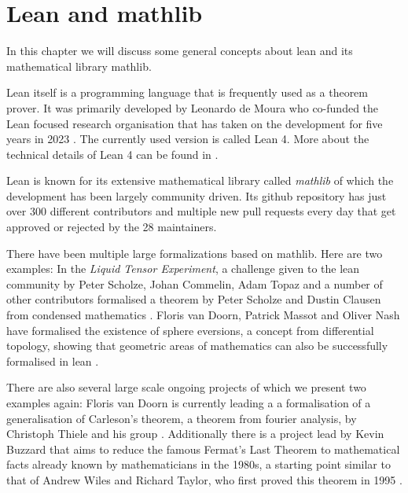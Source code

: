 \chapter{Lean and mathlib}

In this chapter we will discuss some general concepts about lean and its mathematical library mathlib. 

Lean itself is a programming language that is frequently used as a theorem prover. 
It was primarily developed by Leonardo de Moura who co-funded the Lean focused research organisation that has taken on the development for five years in 2023 \cite{LeanFRO2024}. 
The currently used version is called Lean 4.
More about the technical details of Lean 4 can be found in \cite{deMoura2021}.

Lean is known for its extensive mathematical library called \emph{mathlib} of which the development has been largely community driven. 
Its github repository has just over 300 different contributors and multiple new pull requests every day that get approved or rejected by the 28 maintainers. 

There have been multiple large formalizations based on mathlib. 
Here are two examples: 
In the \emph{Liquid Tensor Experiment}, a challenge given to the lean community by Peter Scholze, Johan Commelin, Adam Topaz and a number of other contributors formalised a theorem by Peter Scholze and Dustin Clausen from condensed mathematics \cite{Commelin2022}.
Floris van Doorn, Patrick Massot and Oliver Nash have formalised the existence of sphere eversions, a concept from differential topology, showing that geometric areas of mathematics can also be successfully formalised in lean \cite{vanDoorn2023}. 

There are also several large scale ongoing projects of which we present two examples again: 
Floris van Doorn is currently leading a a formalisation of a generalisation of Carleson's theorem, a theorem from fourier analysis, by Christoph Thiele and his group \cite{Becker2024}.
Additionally there is a project lead by Kevin Buzzard that aims to reduce the famous Fermat's Last Theorem to mathematical facts already known by mathematicians in the 1980s, a starting point similar to that of Andrew Wiles and Richard Taylor, who first proved this theorem in 1995 \cite{Buzzard2024}. 



